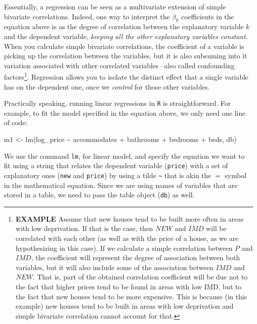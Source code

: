 \documentclass[
]{book}
\newenvironment{Shaded}{\begin{snugshade}}{\end{snugshade}}
\newcommand{\FunctionTok}[1]{\textcolor[rgb]{0.00,0.00,0.00}{#1}}
\newcommand{\NormalTok}[1]{#1}
\newcommand{\OtherTok}[1]{\textcolor[rgb]{0.56,0.35,0.01}{#1}}
\newcommand{\StringTok}[1]{\textcolor[rgb]{0.31,0.60,0.02}{#1}}
\begin{document}
Essentially, a regression can be seen as a multivariate extension of simple bivariate correlations. Indeed, one way to interpret the \(\beta_k\) coefficients in the equation above is as the degree of correlation between the explanatory variable \(k\) and the dependent variable, \emph{keeping all the other explanatory variables constant}. When you calculate simple bivariate correlations, the coefficient of a variable is picking up the correlation between the variables, but it is also subsuming into it variation associated with other correlated variables --also called confounding factors\footnote{\textbf{EXAMPLE} Assume that new houses tend to be built more often in areas with low deprivation. If that is the case, then \(NEW\) and \(IMD\) will be correlated with each other (as well as with the price of a house, as we are hypothesizing in this case). If we calculate a simple correlation between \(P\) and \(IMD\), the coefficient will represent the degree of association between both variables, but it will also include some of the association between \(IMD\) and \(NEW\). That is, part of the obtained correlation coefficient will be due not to the fact that higher prices tend to be found in areas with low IMD, but to the fact that new houses tend to be more expensive. This is because (in this example) new houses tend to be built in areas with low deprivation and simple bivariate correlation cannot account for that.}. Regression allows you to isolate the distinct effect that a single variable has on the dependent one, once we \emph{control} for those other variables.

Practically speaking, running linear regressions in \texttt{R} is straightforward. For example, to fit the model specified in the equation above, we only need one line of code:

\begin{Shaded}
\begin{Highlighting}[]
\NormalTok{m1 }\OtherTok{\textless{}{-}} \FunctionTok{lm}\NormalTok{(}\StringTok{\textquotesingle{}log\_price \textasciitilde{} accommodates + bathrooms + bedrooms + beds\textquotesingle{}}\NormalTok{, db)}
\end{Highlighting}
\end{Shaded}

We use the command \texttt{lm}, for linear model, and specify the equation we want to fit using a string that relates the dependent variable (\texttt{price}) with a set of explanatory ones (\texttt{new} and \texttt{price}) by using a tilde \texttt{\textasciitilde{}} that is akin the \(=\) symbol in the mathematical equation. Since we are using names of variables that are stored in a table, we need to pass the table object (\texttt{db}) as well.
\end{document}
